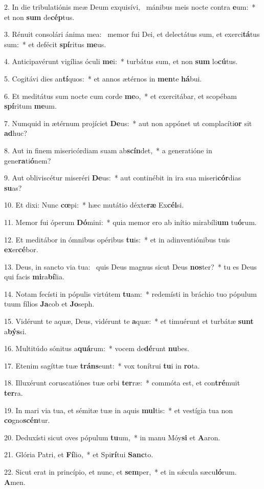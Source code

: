 2. In die tribulatiónis meæ Deum exquisívi, \dag\  mánibus meis nocte contra \textbf{e}um:~*  et non \textbf{sum} de\textbf{cép}tus.\

3. Rénuit consolári ánima mea: \dag\  memor fui Dei, et delectátus sum, et exerci\textbf{tá}tus sum:~*  et defécit \textbf{spí}ritus \textbf{me}us.\

4. Anticipavérunt vigílias óculi \textbf{me}i:~*  turbátus sum, et non \textbf{sum} lo\textbf{cú}tus.\

5. Cogitávi dies an\textbf{tí}quos:~*  et annos ætérnos in \textbf{men}te \textbf{há}bui.\

6. Et meditátus sum nocte cum corde \textbf{me}o,~*  et exercitábar, et scopébam \textbf{spí}ritum \textbf{me}um.\

7. Numquid in ætérnum projíciet \textbf{De}us:~*  aut non appónet ut complacíti\textbf{or} sit \textbf{ad}huc?\

8. Aut in finem misericórdiam suam ab\textbf{scín}det,~*  a generatióne in gene\textbf{ra}ti\textbf{ó}nem?\

9. Aut obliviscétur miseréri \textbf{De}us:~*  aut continébit in ira sua miseri\textbf{cór}dias \textbf{su}as?\

10. Et dixi: Nunc \textbf{cœ}pi:~*  hæc mutátio déxte\textbf{ræ} Ex\textbf{cél}si.\

11. Memor fui óperum \textbf{Dó}mini:~*  quia memor ero ab inítio mirabíli\textbf{um} tu\textbf{ó}rum.\

12. Et meditábor in ómnibus opéribus \textbf{tu}is:~*  et in adinventiónibus tuis \textbf{ex}er\textbf{cé}bor.\

13. Deus, in sancto via tua: \dag\  quis Deus magnus sicut Deus \textbf{nos}ter?~*  tu es Deus qui facis \textbf{mi}ra\textbf{bí}lia.\

14. Notam fecísti in pópulis virtútem \textbf{tu}am:~*  redemísti in bráchio tuo pópulum tuum fílios \textbf{Ja}cob et \textbf{Jo}seph.\

15. Vidérunt te aquæ, Deus, vidérunt te \textbf{a}quæ:~*  et timuérunt et turbátæ \textbf{sunt} a\textbf{býs}si.\

16. Multitúdo sónitus a\textbf{quá}rum:~*  vocem de\textbf{dé}runt \textbf{nu}bes.\

17. Etenim sagíttæ tuæ \textbf{tráns}eunt:~*  vox tonítrui \textbf{tu}i in \textbf{ro}ta.\

18. Illuxérunt coruscatiónes tuæ orbi \textbf{ter}ræ:~*  commóta est, et con\textbf{tré}muit \textbf{ter}ra.\

19. In mari via tua, et sémitæ tuæ in aquis \textbf{mul}tis:~*  et vestígia tua non \textbf{co}gno\textbf{scén}tur.\

20. Deduxísti sicut oves pópulum \textbf{tu}um,~*  in manu Móy\textbf{si} et \textbf{A}aron.\

21. Glória Patri, et \textbf{Fí}lio,~*  et Spi\textbf{rí}tui \textbf{Sanc}to.\

22. Sicut erat in princípio, et nunc, et \textbf{sem}per,~*  et in sǽcula sæcu\textbf{ló}rum. \textbf{A}men.\

